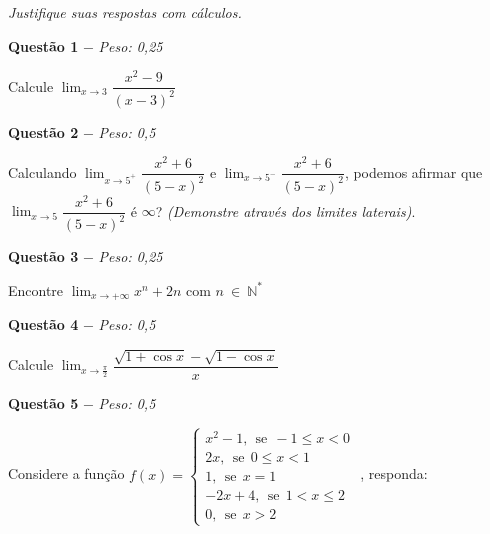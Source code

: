 \documentclass[a4paper,11pt]{article}
\begin{document}
\textit{Justifique suas respostas com cálculos.}

\textbf{Questão 1} $-$ \textit{Peso: 0,25}

Calcule $\displaystyle\lim_{x\rightarrow 3}\dfrac{x^2-9}{(x-3)^2}$

\textbf{Questão 2} $-$ \textit{Peso: 0,5}

Calculando $\displaystyle\lim_{x\rightarrow 5^+}\dfrac{x^2+6}{(5-x)^2}$ e $\displaystyle\lim_{x\rightarrow 5^-}\dfrac{x^2+6}{(5-x)^2}$, podemos afirmar que $\displaystyle\lim_{x\rightarrow 5}\dfrac{x^2+6}{(5-x)^2}$ é $\infty$? \textit{(Demonstre através dos limites laterais)}.

\textbf{Questão 3} $-$ \textit{Peso: 0,25}

Encontre $\displaystyle\lim_{x\rightarrow +\infty}x^n+2n$ com $n \ \in \ \mathbb{N}^*$


\textbf{Questão 4} $-$ \textit{Peso: 0,5}

Calcule $\displaystyle\lim_{x\rightarrow \frac{\pi}{2}}\dfrac{\sqrt{1+\cos x}-\sqrt{1-\cos x}}{x}$


\textbf{Questão 5} $-$ \textit{Peso: 0,5}

Considere a função $f(x)=\left\{\begin{array}{lllll}x^2-1, \ \ \text{se} \ \ -1\leq x<0\\ 2x,  \ \ \text{se} \ \ 0\leq x<1 \\ 1,   \ \ \text{se} \ \ x = 1 \\ -2x+4, \ \ \text{se} \ \ 1< x\leq 2\\  0, \ \ \text{se} \ \  x>2 \end{array}$ , responda:\\
\end{document}
